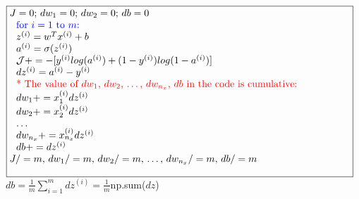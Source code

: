 \documentclass{article}
\begin{document}
$\noindent\fbox{%
\parbox{\textwidth}{%
$J=0$; $dw_1 = 0$; $dw_2 = 0$; $db=0$\\

$\indent$ $\indent$ \textcolor{blue}{for $i=1$ to $m$:}\\
$\indent$ $\indent$ $z^{(i)} = w^T x^{(i)} + b$\\
$\indent$ $\indent$ $a^{(i)} = \sigma(z^{(i)})$\\
$\indent$ $\indent$ $\mathcal{J} += -[y^{(i)} log(a^{(i)}) + (1-y^{(i)})log(1-a^{(i)})]$\\
$\indent$ $\indent$ $dz^{(i)} = a^{(i)}- y^{(i)}$\\

$\indent$ $\indent$ \textcolor{red}{* The value of $dw_1$, $dw_2$, $\dots$, $dw_{n_x}$, $db$ in the code is cumulative:}\\
$\indent$ $\indent$ $dw_1 += x_1^{(i)}dz^{(i)}$\\
$\indent$ $\indent$ $dw_2 += x_2^{(i)}dz^{(i)}$\\
$\indent$ $\indent$ $\dots$\\
$\indent$ $\indent$ $dw_{n_x} += x_{n_x}^{(i)}dz^{(i)}$\\

$\indent$ $\indent$ $db += dz^{(i)}$\\

$J/=m$,  $dw_1 /=m$,  $dw_2 /=m$, \dots, $dw_{n_x} /=m$, $db /=m$\\
    }%
}$\\


$db = \frac{1}{m}\sum_{i=1}^{m}dz^{(i)} = \frac{1}{m}$np.sum($dz$)\\
\end{document}
